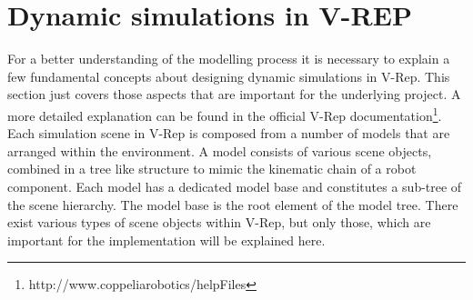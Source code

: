 \section{Dynamic simulations in V-REP}
For a better understanding of the modelling process it is necessary to explain a few fundamental concepts about designing dynamic simulations in V-Rep. This section just covers those aspects that are important for the underlying project. A more detailed explanation can be found in the official V-Rep documentation\footnote{http://www.coppeliarobotics/helpFiles}. \\

Each simulation scene in V-Rep is composed from a number of models that are arranged within the environment. A model consists of various scene objects, combined in a tree like structure to mimic the kinematic chain of a robot component. Each model has a dedicated model base and constitutes a sub-tree of the scene hierarchy. The model base is the root element of the model tree. There exist various types of scene objects within V-Rep, but only those, which are important for the implementation will be explained here.

